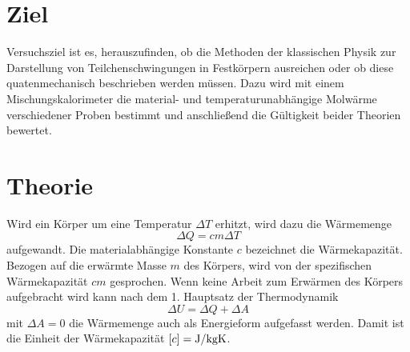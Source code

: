 \section{Ziel}

Versuchsziel ist es, herauszufinden, ob die Methoden der klassischen Physik zur Darstellung von Teilchenschwingungen in Festkörpern ausreichen oder ob diese quatenmechanisch beschrieben werden müssen. Dazu wird mit einem Mischungskalorimeter die material- und temperaturunabhängige Molwärme verschiedener Proben bestimmt und anschließend die Gültigkeit beider Theorien bewertet.
\section{Theorie}
\label{sec:Theorie}

Wird ein Körper  um eine Temperatur $\Delta{T}$ erhitzt, wird dazu die Wärmemenge 
\begin{equation}
\Delta{Q}=c m \Delta{T}
\label{eq:waermekapazitaet}
\end{equation}
aufgewandt. Die materialabhängige Konstante $c$ bezeichnet die Wärmekapazität. Bezogen auf die erwärmte Masse $m$ des Körpers, wird von der spezifischen Wärmekapazität $cm$ gesprochen.
Wenn keine Arbeit zum Erwärmen des Körpers aufgebracht wird kann nach dem 1. Hauptsatz der Thermodynamik
\begin{equation}
	\Delta{U}=\Delta{Q}+\Delta{A}
	\label{eq:hs_1}
\end{equation}
mit $\Delta{A}=0$ die Wärmemenge auch als Energieform aufgefasst werden. Damit ist die Einheit der Wärmekapazität $[c]=\si{\joule\per{\kilo\gram\kelvin}}$.

